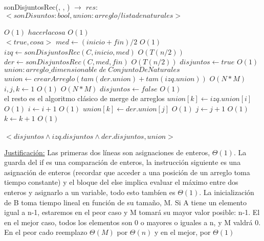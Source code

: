 \documentclass[10pt, a4paper]{article}
\begin{document}
\begin{algorithm}[H]{sonDisjuntosRec(, , ) $\to$ $res$: $<sonDisuntos: bool, union: arreglo/lista de naturales>$}	
	\begin{algorithmic}[1]
							\Comment $O(1)$
			\State $hacer la cosa$			\Comment $O(1)$\\
			\Return $<true, cosa>$
		\Else
			\State $med \gets (inicio + fin)/2$	\Comment $O(1)$
			\State $izq \gets sonDisjuntosRec(C, inicio, med)$	\Comment $O(T(n/2))$
			\State $der \gets sonDisjuntosRec(C, med, fin)$	\Comment $O(T(n/2))$
			\State $disjuntos \gets true$	\Comment $O(1)$
			\State $union: arreglo\_dimensionable\; de\; ConjuntoDeNaturales$
			\State $union \gets crearArreglo(tam(der.union) + tam(izq.union))$	\Comment $O(N*M)$
			\State $i, j, k \gets 1$	\Comment $O(1)$
						\Comment $O(N*M)$
				\State $disjuntos \gets false$	\Comment $O(1)$
				\EndIf \\
				\Comment el resto es el algoritmo clásico de merge de arreglos
					\State $union[k] \gets izq.union[i]$	\Comment $O(1)$
					\State $i \gets i+1$	\Comment $O(1)$
				\Else
					\State $union[k] \gets der.union[j]$	\Comment $O(1)$
					\State $j \gets j+1$	\Comment $O(1)$
				\EndIf
			 	\State $k\gets k+1$			\Comment $O(1)$		 	
			\EndWhile \\
			
		\EndIf	\\
		\Return $<disjuntos \wedge izq.disjuntos \wedge der.disjuntos, union>$
	
		\medskip
		\Statex \underline{Justificación:} Las primeras dos líneas son asignaciones de enteros, $\Theta(1)$. La guarda del if es una comparación de enteros, la instrucción siguiente es una asignación de enteros (recordar que acceder a una posición de un arreglo toma tiempo constante) y el bloque del else implica evaluar el máximo entre dos enteros y asignarlo a un variable, todo esto tambíen es $\Theta(1)$. La inicialización de B toma tiempo lineal en función de su tamaño, M.
		Si A tiene un elemento igual a n-1, estaremos en el peor caso y M tomará su mayor valor posible: n-1. El en el mejor caso, todos los elementos son 0 o mayores o iguales a n, y M valdrá 0. En el peor cado reemplazo $\Theta(M)$ por $\Theta(n)$ y en el mejor, por $\Theta(1)$
    \end{algorithmic}
\end{algorithm}	
\end{document}
